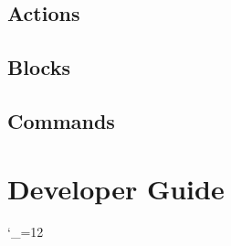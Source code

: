 \documentclass[a4paper,notitlepage]{refrep}
\begin{document}
\section{Actions}


\section{Blocks}


\section{Commands}






\chapter{Developer Guide\label{Developer_Guide}}



\nocite{*}

{\small}

\begingroup \catcode`_=12 %
\printindex
\endgroup
\end{document}
